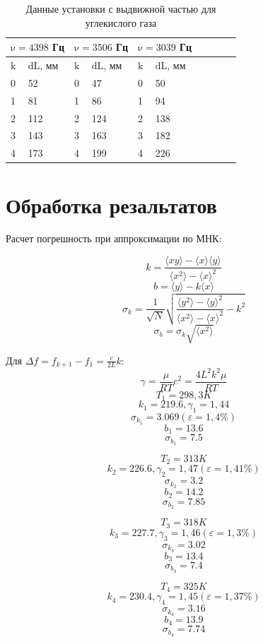 \documentclass[a4paper, 12pt]{article}
\begin{document}
\begin{table}[!h]
\begin{center}
\begin{tabular}{|l|l|l|l|l|l|l|l|l|l|}
\hline \multicolumn{2}{|l|}{$\mathrm{\nu}=4398$ Гц} & \multicolumn{2}{|l|}{$\mathrm{\nu}=3506$ Гц} & \multicolumn{2}{|l|}{$\mathrm{\nu}=3039$ Гц} \\
\hline $\mathrm{k}$ & $\mathrm{dL}$, мм & $\mathrm{k}$ & $\mathrm{dL}$, мм & $\mathrm{k}$ & $\mathrm{dL}$, мм  \\
\hline 0 & 52 & 0 & 47 & 0 & 50 \\
\hline 1 & 81 & 1 & 86 & 1 & 94 \\
\hline 2 & 112 & 2 & 124 & 2 & 138 \\
\hline 3 & 143 & 3 & 163 & 3 & 182 \\
\hline 4 & 173 & 4 & 199 & 4 & 226  \\
\hline
\end{tabular}
\caption{Данные установки с выдвижной частью для углекислого газа}
\end{center}
\end{table}

\section{Обработка резальтатов}

Расчет погрешность при аппроксимации по МНК:

\[k=\frac{\langle xy\rangle-\langle x\rangle \langle y\rangle}{\langle x^2\rangle - \langle x\rangle^2}\]
\[b = \langle y \rangle - k \langle x \rangle\]
\[\sigma_{k} = \frac{1}{\sqrt{N}}\sqrt{\frac{\langle y^2 \rangle - \langle y \rangle ^2}{\langle x^2 \rangle - \langle x \rangle ^2} - k^2}\]
\[\sigma_{b} = \sigma_{k}\sqrt{\langle x^2 \rangle}\]

Для $\Delta f = f_{k+1} - f_{1}= \frac{c}{2L}k$:
\[\gamma = \frac{\mu}{RT}c^2 = \frac{4L^2k^2\mu}{RT}\]
\newline
\[T_1 = 298,3 K\]
\[k_1 = 219.6, \gamma_1 = 1,44\]
\[\sigma_{k_1} = 3.069 (\varepsilon = 1,4\%)\]
\[b_1 = 13.6\]
\[\sigma_{b_1} = 7.5\]

\[T_2 = 313 K\]
\[k_2 = 226.6, \gamma_2 = 1,47(\varepsilon = 1,41\%)\]
\[\sigma_{k_2} = 3.2\]
\[b_2 = 14.2\]
\[\sigma_{b_2} = 7.85\]

\[T_3 = 318 K\]
\[k_3 = 227.7, \gamma_3 = 1,46(\varepsilon = 1,3\%)\]
\[\sigma_{k_3} = 3.02\]
\[b_3 = 13.4\]
\[\sigma_{b_3} = 7.4\]

\[T_4 = 325 K\]
\[k_4 = 230.4, \gamma_4 = 1,45(\varepsilon = 1,37\%)\]
\[\sigma_{k_4} = 3.16\]
\[b_4 = 13.9\]
\[\sigma_{b_4} = 7.74\]
\end{document}
